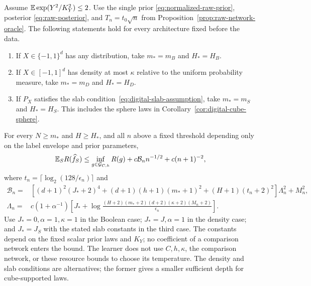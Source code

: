 \begin{theorem}
\label{thm:raw-width-oracle}
Assume $\mathbb E\exp(Y^2/K_Y^2)\le2$.  Use the single prior
\eqref{eq:normalized-raw-prior}, posterior \eqref{eq:raw-posterior}, and
$T_n=t_0\sqrt n$ from Proposition~\ref{prop:raw-network-oracle}.
The following statements hold for every architecture fixed before the data.
\begin{enumerate}
\item If $X\in\{-1,1\}^d$ has any distribution, take $m_*=m_B$ and
$H_*=H_B$.
\item If $X\in[-1,1]^d$ has density at most $\kappa$ relative to the
uniform probability measure, take $m_*=m_D$ and $H_*=H_D$.
\item If $P_X$ satisfies the slab condition~\eqref{eq:digital-slab-assumption},
take $m_*=m_S$ and $H_*=H_S$. This includes the sphere laws in
Corollary~\ref{cor:digital-cube-sphere}.
\end{enumerate}
For every $N\ge m_*$ and $H\ge H_*$, and all $n$ above a fixed
threshold depending only on the label envelope and prior parameters,
\begin{equation}\label{eq:coefficient-free-raw-risk}
 \mathbb E_S R(\widehat f_S)\le
 \inf_{g\in\mathcal G_{C,h}} R(g)
                 +c\mathcal B_n n^{-1/2}+c(n+1)^{-2},
\end{equation}
where $t_n=\lceil\log_2(128/\epsilon_n)\rceil$ and
\begin{align*}
 \mathcal B_n={}&\left[(d+1)^2(J_*+2)^4
 +(d+1)(h+1)(m_*+1)^2+(H+1)(t_n+2)^2\right]\Lambda_n^2+M_n^2,\\
 \Lambda_n={}&c(1+\alpha^{-1})\left[J_*+
 \log\frac{(H+2)(m_*+2)(d+2)(\kappa+2)(M_n+2)}{\epsilon_n}\right].
\end{align*}
Use $J_*=0,\alpha=1,\kappa=1$ in the Boolean case;
$J_*=J,\alpha=1$ in the density case; and $J_*=J_S$ with the stated
slab constants in the third case.
The constants depend on the fixed scalar prior laws and $K_Y$; no
coefficient of a comparison network enters the bound.  The learner does
not use $C,h,\kappa$, the comparison network, or these resource bounds to
choose its temperature. The density and slab conditions are alternatives;
the former gives a smaller sufficient depth for cube-supported laws.
\end{theorem}
